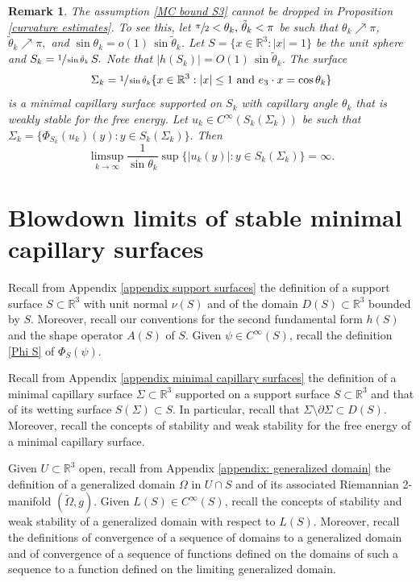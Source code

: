 \documentclass[11pt]{amsart}
\newtheorem{rema}[prop]{Remark}
\begin{document}
\begin{rema} \label{counter 4}
	The assumption \eqref{MC bound S3} cannot be dropped in Proposition \ref{curvature estimates}. To see this, let $\sfrac{\pi}2<\theta_k,\,\tilde \theta_k<\pi$ be such that $\theta_k\nearrow \pi$, $\tilde \theta_k\nearrow \pi,$ and $\sin\theta_k=o(1)\,\sin\tilde \theta_k$. Let $S=\{x\in \mathbb{R}^3:|x|=1\}$ be the unit sphere and  $S_k=\sfrac{1}{ \sin\tilde\theta_k}\,S.$ Note that $|h(S_k)|=O(1)\,\sin\tilde \theta_k$. The surface $$\Sigma_k=\sfrac{1}{ \sin\tilde\theta_k}\{x\in \mathbb{R}^3:|x|\leq 1\text{ and }e_3\cdot x=\cos\theta_k\}$$ is a minimal capillary surface supported on $S_k$ with capillary angle $\theta_k$ that is weakly stable for the free energy. Let $u_k\in C^\infty( S_k(\Sigma_k))$ be such that $\Sigma_k=\{\Phi_{S_k}(u_k)(y):y\in  S_k(\Sigma_k)\}.$ Then
	$$
	\limsup_{k\to\infty}\frac{1}{\sin\theta_k}\sup\{|u_k(y)|:y\in S_k(\Sigma_k)\}=\infty. 
	$$
\end{rema}
\section{Blowdown limits of stable minimal capillary surfaces}
	Recall from Appendix \ref{appendix support surfaces} the definition of a support surface $S\subset \mathbb{R}^3$ with unit normal $\nu(S)$  and of the domain $D(S)\subset \mathbb{R}^3$ bounded by $S$. Moreover, recall  our conventions for the second fundamental form $h(S)$ and the shape operator $A(S)$ of $S$. Given $\psi \in C^\infty(S)$, recall the definition \eqref{Phi S} of $\Phi_S(\psi)$.


Recall from Appendix \ref{appendix minimal capillary surfaces}  the  definition of a minimal capillary surface $\Sigma \subset \mathbb{R}^3$ supported on a support surface $S\subset \mathbb{R}^3$  and that of its  wetting surface $S(\Sigma)\subset S$. In particular, recall that  $\Sigma\setminus \partial \Sigma \subset D(S)$.  Moreover, recall the concepts of  stability and weak stability for the free energy  of a minimal capillary surface.

Given $U\subset \mathbb{R}^3$ open, recall from Appendix \ref{appendix: generalized domain} the definition of a generalized domain $\Omega$ in $U\cap S$ and of its associated Riemannian 2-manifold $(\tilde \Omega,g)$. Given $L(S)\in C^\infty(S)$, recall the concepts of  stability and weak stability of a generalized domain  with respect to $L(S)$.  Moreover, recall the definitions of convergence of a sequence of domains to a generalized domain and of convergence of a sequence of functions defined on the domains of such a sequence to a function defined on the limiting generalized domain.
\end{document}
